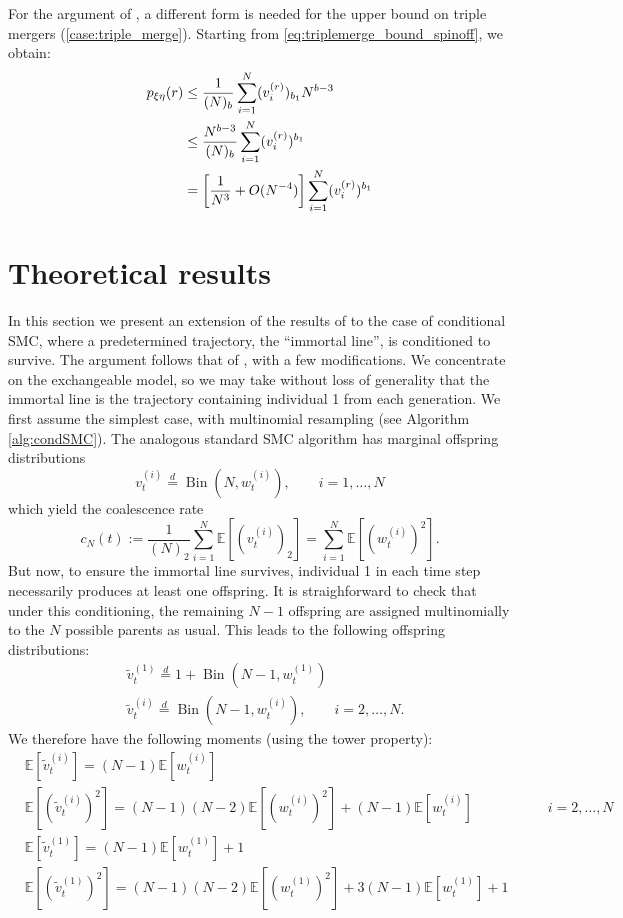\documentclass{article}
\newcommand{\E}{\mathbb{E}}
\newcommand{\vt}[2][t]{v_{#1}^{(#2)}}
\newcommand{\vttilde}[2][t]{\tilde{v}_{#1}^{(#2)}}
\newcommand{\wt}[2][t]{w_{#1}^{(#2)}}
\newcommand{\eqdist}{\overset{d}{=}}
\newcommand{\Bin}{\operatorname{Bin}}
\begin{document}
For the argument of \citet{koskela2018}, a different form is needed for the upper bound on triple mergers (\ref{case:triple_merge}). Starting from \eqref{eq:triplemerge_bound_spinoff}, we obtain:
\begin{align}
p_{\xi\eta}(r) &\leq \frac{1}{(N)_b} \sum_{i=1}^{N} (v_{i}^{(r)})_{b_1} N^{b-3} \notag\\
&\leq \frac{N^{b-3}}{(N)_b} \sum_{i=1}^{N} (v_{i}^{(r)})^{b_1} \notag\\
&= \left[ \frac{1}{N^3} + O(N^{-4}) \right] \sum_{i=1}^{N} (v_{i}^{(r)})^{b_1}
\end{align}


\section{Theoretical results}\label{sec:theory}
In this section we present an extension of the results of \citet{koskela2018} to the case of conditional SMC, where a predetermined trajectory, the ``immortal line'', is conditioned to survive. The argument follows that of \citet{koskela2018}, with a few modifications.
We concentrate on the exchangeable model, so we may take without loss of generality that the immortal line is the trajectory containing individual 1 from each generation.
We first assume the simplest case, with multinomial resampling (see Algorithm \ref{alg:condSMC}). The analogous standard SMC algorithm has marginal offspring distributions
\begin{equation*}
\vt{i} \eqdist \Bin (N, \wt{i}), \qquad i=1,\dots,N
\end{equation*}
which yield the coalescence rate
\begin{equation}
c_N(t) := \frac{1}{(N)_2} \sum_{i=1}^{N} \E\left[ (\vt{i})_2 \right] = \sum_{i=1}^{N} \E\left[(\wt{i})^2\right].
\end{equation}
But now, to ensure the immortal line survives, individual 1 in each time step necessarily produces at least one offspring. It is straighforward to check that under this conditioning, the remaining $N-1$ offspring are assigned multinomially to the $N$ possible parents as usual. This leads to the following offspring distributions:
\begin{align*}
& \vttilde{1} \eqdist 1 + \Bin(N-1, \wt{1}) \\
& \vttilde{i} \eqdist \Bin(N-1, \wt{i}), \qquad i=2,\dots,N.
\end{align*}
We therefore have the following moments (using the tower property):
\begin{align*}
& \E[\vttilde{i}] = (N-1)\E[\wt{i}] &\\
& \E[(\vttilde{i})^2] = (N-1)(N-2)\E[(\wt{i})^2] + (N-1)\E[\wt{i}] &\qquad i=2,\dots,N \\
& \E[\vttilde{1}] = (N-1)\E[\wt{1}] + 1 \\
& \E[(\vttilde{1})^2] = (N-1)(N-2)\E[(\wt{1})^2] + 3(N-1)\E[\wt{1}] + 1 &
\end{align*}
\end{document}
